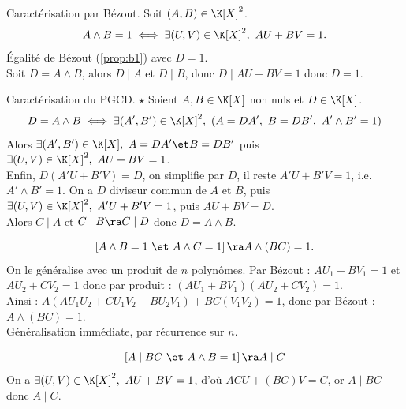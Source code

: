 \documentclass[11pt]{article}
\begin{document}
\begin{prop}{Caractérisation par Bézout.}{}
    Soit $(A,B)\in\K[X]^2$.
    \begin{equation*}
        A\land B = 1 \iff \exists (U,V) \in \K[X]^2, ~ AU+BV=1.
    \end{equation*}
    \tcblower
    \boxed{\ra} Égalité de Bézout (\ref{prop:b1}) avec $D=1$.\\
    \boxed{\la} Soit $D=A\land B$, alors $D\mid A$ et $D\mid B$, donc $D\mid AU+BV=1$ donc $D=1$.
\end{prop}

\vspace*{-0.8cm}

\begin{thm}{Caractérisation du PGCD. $\star$}{}
    Soient $A,B\in\K[X]$ non nuls et $D\in\K[X]$.
    \begin{equation*}
        D=A\land B \iff \exists (A',B')\in\K[X]^2, ~ (A = DA', ~ B=DB', ~ A'\land B'=1)
    \end{equation*}
    \tcblower
    \boxed{\ra} Alors $\exists (A',B')\in\K[X], ~ A=DA' \et B=DB'$ puis $\exists (U,V)\in\K[X]^2, ~ AU+BV=1$.\\
    Enfin, $D(A'U+B'V)=D$, on simplifie par $D$, il reste $A'U+B'V=1$, i.e. $A'\land B'=1$.\n
    \boxed{\la} On a $D$ diviseur commun de $A$ et $B$, puis $\exists (U,V)\in\K[X]^2, ~ A'U+B'V=1$, puis $AU+BV=D$.\\
    Alors $C\mid A$ et $C\mid B \ra C \mid D$ donc $D=A\land B$.
\end{thm}

\vspace*{-0.4cm}

\begin{prop}{}{}
    \begin{equation*}
        \left[A\land B=1 ~\et~ A\land C = 1\right] \ra A\land(BC)=1.
    \end{equation*}
    On le généralise avec un produit de $n$ polynômes.
    \tcblower
     Par Bézout : $AU_1+BV_1=1$ et $AU_2+CV_2=1$ donc par produit : $(AU_1+BV_1)(AU_2+CV_2)=1$.\\
    Ainsi : $A(AU_1U_2 + CU_1V_2 + BU_2V_1) + BC(V_1V_2) = 1$, donc par Bézout : $A\land (BC)=1$.\\
     Généralisation immédiate, par récurrence sur $n$.
\end{prop}

\vspace*{-0.8cm}

\begin{prop}{}{}
    \begin{equation*}
        \left[A\mid BC ~\et~ A\land B = 1\right]\ra A \mid C
    \end{equation*}
    \tcblower
    On a $\exists (U,V)\in\K[X]^2, ~ AU+BV=1$, d'où $ACU+(BC)V=C$, or $A\mid BC$ donc $A\mid C$. 
\end{prop}
\end{document}

